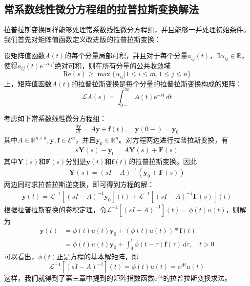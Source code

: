 \subsection{常系数线性微分方程组的拉普拉斯变换解法}\label{sub:laplace_ode_system}

拉普拉斯变换同样能够处理常系数线性微分方程组，并且能够一并处理初始条件。我们首先对矩阵值函数定义改进版的拉普拉斯变换：
\begin{definition}[矩阵值函数的拉普拉斯变换]
    设矩阵值函数$A(t)$的每个分量局部可积，并且对于每个分量$a_{ij}(t)$，$\exists \alpha_{ij}\in\mathbb{R}$，使得$a_{ij}(t)\mathrm{e}^{-\alpha_{ij} t}$绝对可积，则在所有分量的公共收敛域
    $$\mathrm{Re}(s)\geq \max\{\alpha_{ij}|1\leq i\leq m,1\leq j\leq n\}$$上，矩阵值函数$A(t)$的拉普拉斯变换是每个分量的拉普拉斯变换构成的矩阵：
    \[\mathcal{L} A(s)=\int_{0-}^{\infty}A(t)\mathrm{e}^{-st}\,dt\]
\end{definition}

考虑如下常系数线性微分方程组：
\begin{align*}
    \frac{d\mathbf{y}}{dt}=A\mathbf{y}+\mathbf{f}(t),\quad \mathbf{y}(0-)=\mathbf{y}_0
\end{align*}
其中$A\in\mathbb{R} ^{n\times n},\mathbf{y},\mathbf{f}\in\mathcal{E} ^n$，并且$\mathbf{y}_0\in\mathbb{R} ^n$。对方程两边进行拉普拉斯变换，有
\begin{align*}
    s\mathbf{Y}(s)-\mathbf{y}_0=A\mathbf{Y}(s)+\mathbf{F}(s)
\end{align*}
其中$\mathbf{Y}(s)$和$\mathbf{F}(s)$分别是$\mathbf{y}(t)$和$\mathbf{f}(t)$的拉普拉斯变换。因此
\begin{align*}
    \mathbf{Y}(s)=(sI-A)^{-1}(\mathbf{y}_0+\mathbf{F}(s))
\end{align*}
两边同时求拉普拉斯逆变换，即可得到方程的解：\begin{align*}
    \mathbf{y}(t)=\mathcal{L} ^{-1} \left[(sI-A)^{-1}\mathbf{y}_0\right](t)+\mathcal{L} ^{-1} \left[(sI-A)^{-1}\mathbf{F}(s)\right](t)
\end{align*}
根据拉普拉斯变换的卷积定理，令$\mathcal{L} ^{-1} \left[(sI-A)^{-1}\right](t)=\phi(t)u(t)$，则解为\begin{align*}
    \mathbf{y}(t)&=\phi(t)u(t)\mathbf{y}_0+(\phi(t)u(t))*\mathbf{f}(t)\\
    &=\phi(t)u(t)\mathbf{y}_0+\int_0^{t}\phi(t-\tau)\mathbf{f}(\tau)\,d\tau,\quad t>0
\end{align*}
可以看出，$\phi(t)$正是方程的基本解矩阵，即
$$\mathcal{L}^{-1} \left[(sI-A)^{-1}\right](t)=\phi(t)u(t)=\mathrm{e}^{At}u(t)$$
这样，我们就得到了第三章中提到的矩阵指数函数$\mathrm{e}^{At}$的拉普拉斯变换求法。

